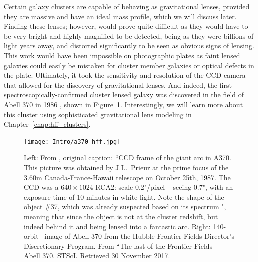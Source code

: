 Certain galaxy clusters are capable of behaving as gravitational lenses, provided they are massive and have an ideal mass profile, which we will discuss later. Finding these lenses; however, would prove quite difficult as they would have to be very bright and highly magnified to be detected, being as they were billions of light years away, and distorted significantly to be seen as obvious signs of lensing. This work would have been impossible on photographic plates as faint lensed galaxies could easily be mistaken for cluster member galaxies or optical defects in the plate. Ultimately, it took the sensitivity and resolution of the CCD camera that allowed for the discovery of gravitational lenses. And indeed, the first spectroscopically-confirmed cluster lensed galaxy was discovered in the field of Abell 370 in 1986 \citep{Soucail:1988kx,Soucail:1987sf,Soucail:1987rz}, shown in Figure~\ref{intro:fig:a370}. Interestingly, we will learn more about this cluster using sophisticated gravitational lens modeling in Chapter~\ref{chap:hff_clusters}.

\begin{figure}
\texttt{[image: Intro/a370\_hff.jpg]}
\caption[Images of Abell 370 -- the first cluster lens]{Left: From \citet{Soucail:1988kx}, original caption: ``CCD frame of the giant arc in A370. This picture was obtained by J.L.~Prieur at the prime focus of the 3.60m Canada-France-Hawaii telescope on October 25th, 1987. The CCD was a $640\times1024$ RCA2: scale 0.2"/pixel -- seeing 0.7", with an exposure time of 10 minutes in white light. Note the shape of the object \#37, which was already suspected based on its spectrum \citet{Soucail:1987sf}", meaning that since the object is not at the cluster redshift, but indeed behind it and being lensed into a fantastic arc. Right: 140-orbit \hst\ image of Abell 370 from the Hubble Frontier Fields Director's Discretionary Program. From ``The last of the Frontier Fields -- Abell 370. STScI. Retrieved 30 November 2017.}
\label{intro:fig:a370}
\end{figure}

